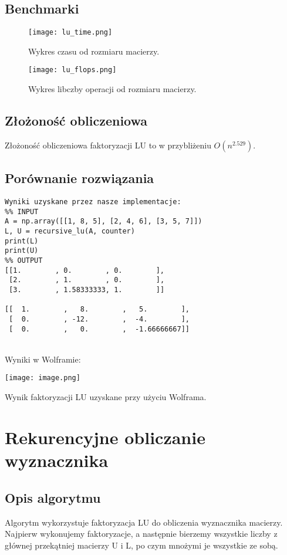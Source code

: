 \documentclass{article}
\begin{document}
\subsection{Benchmarki}

\begin{center}
\begin{figure}[H]
  \texttt{[image: lu\_time.png]}
  \caption{Wykres czasu od rozmiaru macierzy.}
\end{figure}

\begin{figure}[H]
  \texttt{[image: lu\_flops.png]}
  \caption{Wykres libczby operacji od rozmiaru macierzy.}
\end{figure}
\end{center}

\subsection{Złożoność obliczeniowa}

\qquad Złożoność obliczeniowa faktoryzacji LU to w przybliżeniu $O(n^{2.529})$.

\subsection{Porównanie rozwiązania}
\begin{lstlisting}
Wyniki uzyskane przez nasze implementacje:
%% INPUT
A = np.array([[1, 8, 5], [2, 4, 6], [3, 5, 7]])
L, U = recursive_lu(A, counter)
print(L)
print(U)
%% OUTPUT
[[1.        , 0.        , 0.        ],
 [2.        , 1.        , 0.        ],
 [3.        , 1.58333333, 1.        ]]

[[  1.        ,   8.        ,   5.        ],
 [  0.        , -12.        ,  -4.        ],
 [  0.        ,   0.        ,  -1.66666667]]
\end{lstlisting} \\
Wyniki w Wolframie:
\begin{center}
  \texttt{[image: image.png]}
  \caption{Wynik faktoryzacji LU uzyskane przy użyciu Wolframa.}
\end{center}
\section{Rekurencyjne obliczanie wyznacznika}

\subsection{Opis algorytmu}
\qquad Algorytm wykorzystuje faktoryzacja LU do obliczenia wyznacznika macierzy. Najpierw wykonujemy faktoryzacje, a następnie bierzemy wszystkie liczby z głównej przekątniej macierzy U i L, po czym mnożymi je wszystkie ze sobą. \\
\end{document}
